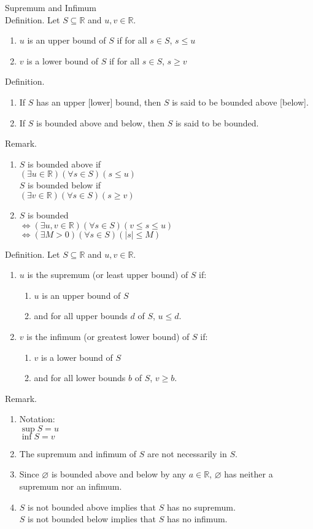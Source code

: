 \documentclass[twocolumn]{article}
\let\emptyset\varnothing
\newcommand{\reals}{\mathbb{R}}
\begin{document}
Supremum and Infimum \\
Definition. Let $S \subseteq \reals$ and $u, v \in \reals$.
\begin{enumerate}
	\item
		$u$ is an upper bound of $S$ if for all $s \in S$, $s \leq u$
	\item
		$v$ is a lower bound of $S$ if for all $s \in S$, $s \geq v$
\end{enumerate}
Definition.
\begin{enumerate}
	\item
		If $S$ has an upper [lower] bound, then $S$ is said to be bounded above [below].
	\item
		If $S$ is bounded above and below, then $S$ is said to be bounded.
\end{enumerate}
Remark.
\begin{enumerate}
	\item
		$S$ is bounded above if \\
		$(\exists u \in \reals)(\forall s \in S)(s \leq u)$ \\
		$S$ is bounded below if \\
		$(\exists v \in \reals)(\forall s \in S)(s \geq v)$
	\item
		$S$ is bounded \\
		$\Leftrightarrow (\exists u, v \in \reals)(\forall s \in S)(v \leq s \leq u)$ \\
		$\Leftrightarrow (\exists M > 0)(\forall s \in S)(|s| \leq M)$
\end{enumerate}
Definition. Let $S \subseteq \reals$ and $u, v \in \reals$.
\begin{enumerate}
	\item
		$u$ is the supremum (or least upper bound) of $S$ if:
		\begin{enumerate}
			\item
				$u$ is an upper bound of $S$
			\item
				and for all upper bounds $d$ of $S$, $u \leq d$.
		\end{enumerate}
	\item
		$v$ is the infimum (or greatest lower bound) of $S$ if:
		\begin{enumerate}
			\item
				$v$ is a lower bound of $S$
			\item
				and for all lower bounds $b$ of $S$, $v \geq b$.
		\end{enumerate}
\end{enumerate}
Remark.
\begin{enumerate}
	\item
		Notation: \\
		$\sup S = u$ \\
		$\inf S = v$
	\item
		The supremum and infimum of $S$ are not necessarily in $S$.
	\item
		Since $\emptyset$ is bounded above and below by any $a \in \reals$, $\emptyset$ has neither a supremum nor an infimum.
	\item
		$S$ is not bounded above implies that $S$ has no supremum. \\
		$S$ is not bounded below implies that $S$ has no infimum.
\end{enumerate}
\end{document}
